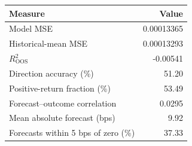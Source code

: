 \begin{tabular}{@{}lr@{}}
\toprule
Measure & Value \\
\midrule
Model MSE & 0.00013365 \\
Historical-mean MSE & 0.00013293 \\
$R^2_{\mathrm{OOS}}$ & -0.00541 \\
Direction accuracy (\%) & 51.20 \\
Positive-return fraction (\%) & 53.49 \\
Forecast--outcome correlation & 0.0295 \\
Mean absolute forecast (bps) & 9.92 \\
Forecasts within 5 bps of zero (\%) & 37.33 \\
\bottomrule
\end{tabular}
